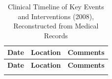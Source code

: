 
\vspace{1em}

\begin{longtable}{
  >{\raggedright\arraybackslash}p{3.0cm}
  >{\raggedright\arraybackslash}p{3.3cm}
  >{\raggedright\arraybackslash}p{9.2cm}
}
\caption{Clinical Timeline of Key Events and Interventions (2008), Reconstructed from Medical Records}
\label{tab:clinical-timeline-2008} \\
\toprule
\textbf{Date} & \textbf{Location} & \textbf{Comments} \\
\midrule
\endfirsthead

\toprule
\textbf{Date} & \textbf{Location} & \textbf{Comments} \\
\midrule
\endhead

\endfoot


\end{longtable}
